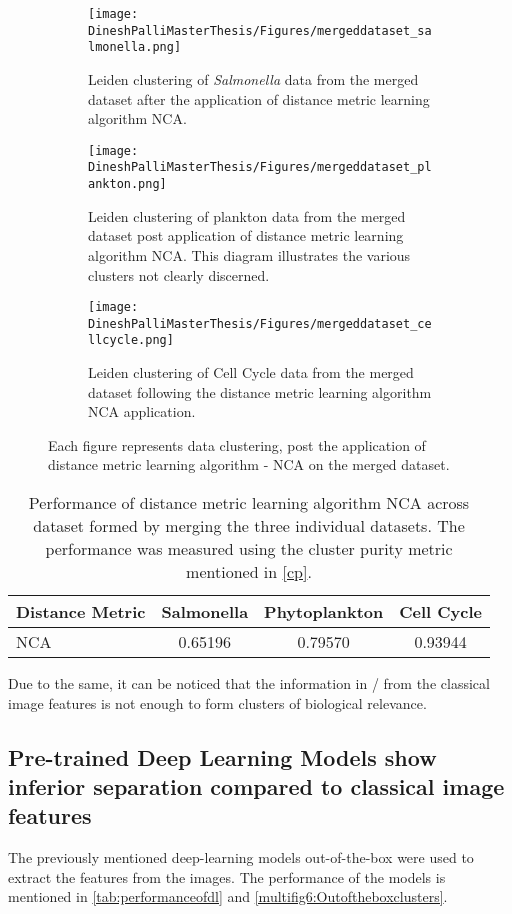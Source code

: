 \documentclass[12pt,a4paper]{article}
\begin{document}
\begin{figure}
  \centering
  \begin{subfigure}{\linewidth}
    \texttt{[image: DineshPalliMasterThesis/Figures/mergeddataset\_salmonella.png]}
    \caption{Leiden clustering of \textit{Salmonella} data from the merged dataset after the application of distance metric learning algorithm NCA.}
    \label{multifig5:image_a}
  \end{subfigure}
  \hfill
  \begin{subfigure}{\linewidth}
    \texttt{[image: DineshPalliMasterThesis/Figures/mergeddataset\_plankton.png]}
    \caption{Leiden clustering of plankton data from the merged dataset post application of distance metric learning algorithm NCA. This diagram illustrates the various clusters not clearly discerned.}
    \label{multifig5:image_b}
  \end{subfigure}
  \hfill
  \begin{subfigure}{\linewidth}
    \texttt{[image: DineshPalliMasterThesis/Figures/mergeddataset\_cellcycle.png]}
    \caption{Leiden clustering of Cell Cycle data from the merged dataset following the distance metric learning algorithm NCA application.}
    \label{multifig5:image_c}
  \end{subfigure}
  \caption{Each figure represents data clustering, post the application of distance metric learning algorithm - NCA on the merged dataset.}
  \label{multifig5:mergeddataset_clusters}
\end{figure}


\begin{table}[h]
\small
\centering
\caption{Performance of distance metric learning algorithm NCA across dataset formed by merging the three individual datasets. The performance was measured using the cluster purity metric mentioned in \ref{cp}.}
\label{tab:DMLonmergeddataset}
\begin{tabular}{lccc}
\hline
\textbf{Distance Metric} & \textbf{Salmonella} & \textbf{Phytoplankton} & \textbf{Cell Cycle} \\
\hline
NCA & 0.65196 & 0.79570 & 0.93944 \\
\hline
\end{tabular}
\end{table}


Due to the same, it can be noticed that the information in / from the classical image features is not enough to form clusters of biological relevance.

\subsection{Pre-trained Deep Learning Models show inferior separation compared to classical image features}
The previously mentioned deep-learning models out-of-the-box were used to extract the features from the images. The performance of the models is mentioned in \ref{tab:performanceofdl} and \ref{multifig6:Outoftheboxclusters}.
\end{document}

